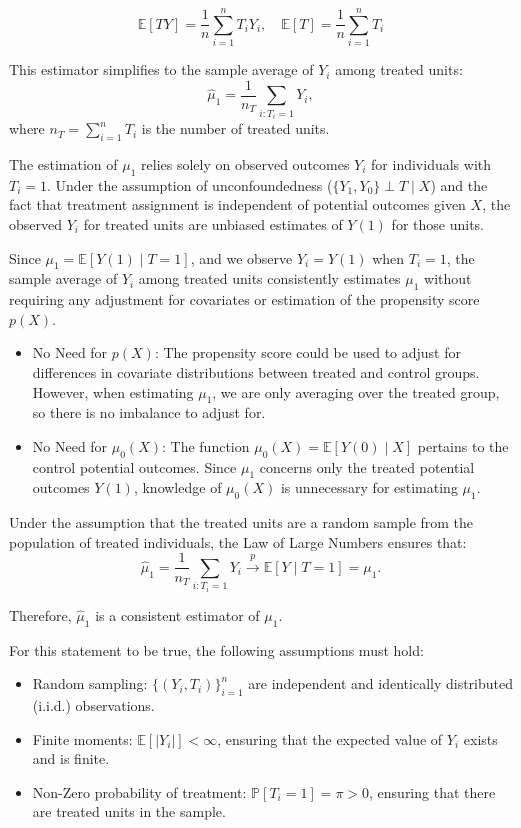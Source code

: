 \documentclass{article}
\begin{document}
$$
\mathbb{E}[TY] = \frac{1}{n} \sum_{i=1}^n T_i Y_i, \quad
\mathbb{E}[T] = \frac{1}{n} \sum_{i=1}^n T_i
$$

This estimator simplifies to the sample average of \(Y_i\) among treated units:
\[
\hat{\mu}_1 = \frac{1}{n_T} \sum_{i: T_i = 1} Y_i,
\]
where \(n_T = \sum_{i=1}^n T_i\) is the number of treated units.

The estimation of \(\mu_1\) relies solely on observed outcomes \(Y_i\) for individuals with \(T_i = 1\). Under the assumption of unconfoundedness (\(\{Y_1, Y_0\} \perp T \mid X\)) and the fact that treatment assignment is independent of potential outcomes given \(X\), the observed \(Y_i\) for treated units are unbiased estimates of \(Y(1)\) for those units.

Since \(\mu_1 = \mathbb{E}[Y(1) \mid T = 1]\), and we observe \(Y_i = Y(1)\) when \(T_i = 1\), the sample average of \(Y_i\) among treated units consistently estimates \(\mu_1\) without requiring any adjustment for covariates or estimation of the propensity score \(p(X)\).

\begin{itemize}
    \item No Need for \(p(X)\): The propensity score could be used to adjust for differences in covariate distributions between treated and control groups. However, when estimating \(\mu_1\), we are only averaging over the treated group, so there is no imbalance to adjust for.
    \item No Need for \(\mu_0(X)\): The function \(\mu_0(X) = \mathbb{E}[Y(0) \mid X]\) pertains to the control potential outcomes. Since \(\mu_1\) concerns only the treated potential outcomes \(Y(1)\), knowledge of \(\mu_0(X)\) is unnecessary for estimating \(\mu_1\).
\end{itemize}

Under the assumption that the treated units are a random sample from the population of treated individuals, the Law of Large Numbers ensures that:
\[
\hat{\mu}_1 = \frac{1}{n_T} \sum_{i: T_i = 1} Y_i \xrightarrow{p} \mathbb{E}[Y \mid T = 1] = \mu_1.
\]

Therefore, \(\hat{\mu}_1\) is a consistent estimator of \(\mu_1\).

For this statement to be true, the following assumptions must hold:
\begin{itemize}
    \item Random sampling: \(\{(Y_i, T_i)\}_{i=1}^n\) are independent and identically distributed (i.i.d.) observations.
    \item Finite moments: \(\mathbb{E}[|Y_i|] < \infty\), ensuring that the expected value of \(Y_i\) exists and is finite.
    \item Non-Zero probability of treatment: \(\mathbb{P}[T_i = 1] = \pi > 0\), ensuring that there are treated units in the sample.
\end{itemize}
\end{document}
